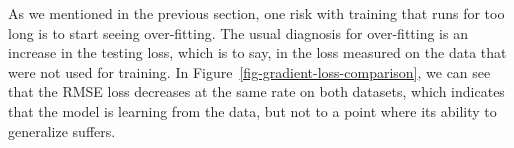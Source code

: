 \documentclass[
  letterpaper,
]{scrbook}
\begin{document}
As we mentioned in the previous section, one risk with training that
runs for too long is to start seeing over-fitting. The usual diagnosis
for over-fitting is an increase in the testing loss, which is to say, in
the loss measured on the data that were not used for training. In
Figure~\ref{fig-gradient-loss-comparison}, we can see that the RMSE loss
decreases at the same rate on both datasets, which indicates that the
model is learning from the data, but not to a point where its ability to
generalize suffers.


{
\makeatletter
\def\LT@makecaption#1#2#3{%
  \noalign{\smash{\hbox{\kern\textwidth\rlap{\kern\marginparsep
  \parbox[t]{\marginparwidth}{%
    \footnotesize{%
      \vspace{(1.1\baselineskip)}
    #1{#2: }\ignorespaces #3}}}}}}%
    }
\makeatother

\begin{figure}[bt]



\end{figure}%

}
\end{document}
